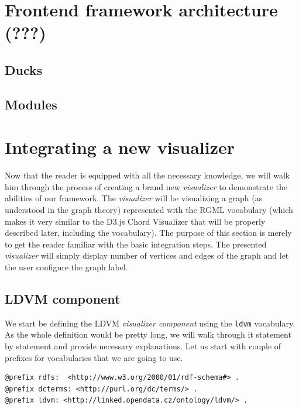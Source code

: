 \section{Frontend framework architecture (???)}

\subsection{Ducks}

\subsection{Modules}


\section{Integrating a new visualizer}

Now that the reader is equipped with all the necessary knowledge, we will walk him through the process of creating a brand new \emph{visualizer} to demonstrate the abilities of our framework. The \emph{visualizer} will be visualizing a graph (as understood in the graph theory) represented with the RGML vocabulary (which makes it very similar to the D3.js Chord Visualizer that will be properly described later, including the vocabulary). The purpose of this section is merely to get the reader familiar with the basic integration steps. The presented \emph{visualizer} will simply display number of vertices and edges of the graph and let the user configure the graph label.

\subsection{LDVM component}

We start be defining the LDVM \emph{visualizer component} using the \texttt{ldvm} vocabulary. As the whole definition would be pretty long, we will walk through it statement by statement and provide necessary explanations. Let us start with couple of prefixes for vocabularies that we are going to use.

\scriptsize
\begin{verbatim}
@prefix rdfs:  <http://www.w3.org/2000/01/rdf-schema#> .
@prefix dcterms: <http://purl.org/dc/terms/> .
@prefix ldvm: <http://linked.opendata.cz/ontology/ldvm/> .
\end{verbatim}
\normalsize

